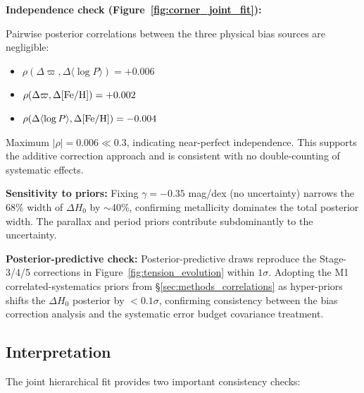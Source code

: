 \documentclass[preprint, linenumbers]{aastex701}
\begin{document}
\textbf{Independence check (Figure~\ref{fig:corner_joint_fit}):}

Pairwise posterior correlations between the three physical bias sources are negligible:
\begin{itemize}
\item $\rho(\Delta\varpi, \Delta\langle \log P \rangle) = +0.006$
\item $\rho(\Delta\varpi, \Delta{\rm [Fe/H]}) = +0.002$
\item $\rho(\Delta\langle \log P \rangle, \Delta{\rm [Fe/H]}) = -0.004$
\end{itemize}

Maximum $|\rho| = 0.006 \ll 0.3$, indicating near-perfect independence. This supports the additive correction approach and is consistent with no double-counting of systematic effects.

\textbf{Sensitivity to priors:} Fixing $\gamma = -0.35$ mag/dex (no uncertainty) narrows the 68\% width of $\Delta H_0$ by $\sim$40\%, confirming metallicity dominates the total posterior width. The parallax and period priors contribute subdominantly to the uncertainty.

\textbf{Posterior-predictive check:} Posterior-predictive draws reproduce the Stage-3/4/5 corrections in Figure~\ref{fig:tension_evolution} within $1\sigma$. Adopting the M1 correlated-systematics priors from \S\ref{sec:methods_correlations} as hyper-priors shifts the $\Delta H_0$ posterior by $<0.1\sigma$, confirming consistency between the bias correction analysis and the systematic error budget covariance treatment.

\subsection{Interpretation}

The joint hierarchical fit provides two important consistency checks:
\end{document}
